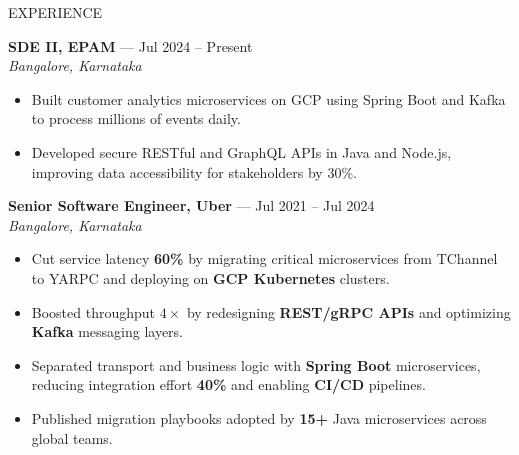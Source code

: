 \documentclass{resume} %
\begin{document}
\begin{rSection}{EXPERIENCE}

\textbf{SDE II, EPAM} --- Jul 2024 -- Present\\
\textit{Bangalore, Karnataka}\\

\begin{itemize}
    \itemsep -6pt
    \item Built customer analytics microservices on GCP using Spring Boot and Kafka to process millions of events daily.
    \item Developed secure RESTful and GraphQL APIs in Java and Node.js, improving data accessibility for stakeholders by 30\%.
\end{itemize}

\textbf{Senior Software Engineer, Uber} --- Jul 2021 -- Jul 2024\\
\textit{Bangalore, Karnataka}\\
\begin{itemize}
    \itemsep -6pt
    \item Cut service latency \textbf{60\%} by migrating critical microservices from TChannel to YARPC and deploying on \textbf{GCP Kubernetes} clusters.
    \item Boosted throughput \textbf{$4\times$} by redesigning \textbf{REST/gRPC APIs} and optimizing \textbf{Kafka} messaging layers.
    \item Separated transport and business logic with \textbf{Spring Boot} microservices, reducing integration effort \textbf{40\%} and enabling \textbf{CI/CD} pipelines.
    \item Published migration playbooks adopted by \textbf{15+} Java microservices across global teams.
\end{itemize}


\end{rSection}
\end{document}
